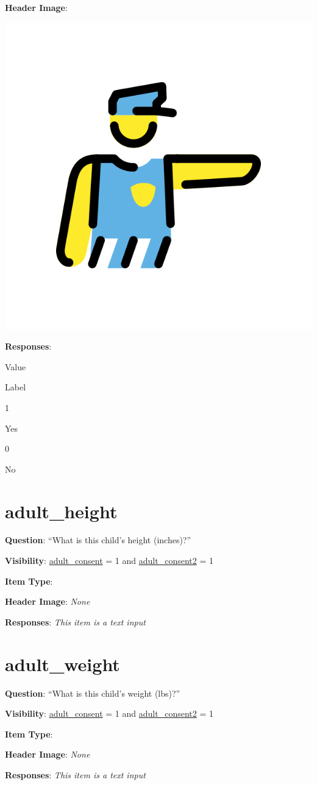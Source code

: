 \documentclass[]{book}
\begin{document}
\textbf{Header Image}:

\begin{flushleft}\includegraphics[width=0.33\linewidth]{downloadFigs4latex_HBN_PMHS_Codebook/adult_CRAFFT_Trouble_headerImg} \end{flushleft}

\textbf{Responses}:

Value

Label

1

Yes

0

No

\hypertarget{adult_height}{%
\section{adult\_height}\label{adult_height}}

\textbf{Question}: ``What is this child's height (inches)?''

\textbf{Visibility}: \protect\hyperlink{adult_consent}{adult\_consent} = 1 and \protect\hyperlink{adult_consent2}{adult\_consent2} = 1

\textbf{Item Type}:

\textbf{Header Image}: \emph{None}

\textbf{Responses}: \emph{This item is a text input}

\hypertarget{adult_weight}{%
\section{adult\_weight}\label{adult_weight}}

\textbf{Question}: ``What is this child's weight (lbs)?''

\textbf{Visibility}: \protect\hyperlink{adult_consent}{adult\_consent} = 1 and \protect\hyperlink{adult_consent2}{adult\_consent2} = 1

\textbf{Item Type}:

\textbf{Header Image}: \emph{None}

\textbf{Responses}: \emph{This item is a text input}
\end{document}
